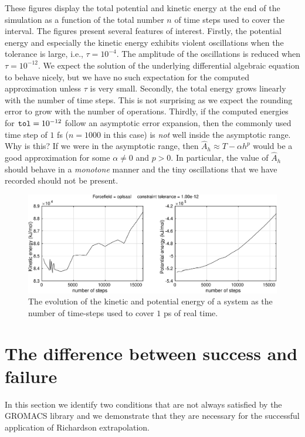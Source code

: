 \documentclass[runningheads]{llncs}
\begin{document}
These figures display the total potential and kinetic energy at the end of the simulation as a function of the total number $n$ of time steps used to cover the interval. The figures present several features of interest.
Firstly, the potential energy and especially the kinetic energy exhibits violent oscillations when the tolerance is large, i.e., $\tau = 10^{-4}$. The amplitude of the oscillations is reduced when $\tau = 10^{-12}$. We expect the solution of the underlying differential algebraic equation to behave nicely, but we have no such expectation for the computed approximation unless $\tau$ is very small. 
Secondly, the total energy grows linearly with the number of time steps. This is not surprising as we expect the rounding error to grow with the number of operations.
Thirdly, if the computed energies for ${\tt tol} = 10 ^{-12}$ follow an asymptotic error expansion, then the commonly used time step of $1$ fs ($n=1000$ in this case) is \emph{not} well inside the asymptotic range. Why is this? If we were in the asymptotic range, then $\hat{A}_h \approx T - \alpha h^p$ would be a good approximation for some $\alpha \not = 0$ and $p>0$. In particular, the value of $\hat{A}_h$ should behave in a \emph{monotone} manner and the tiny oscillations that we have recorded should not be present.




\begin{figure}
  \centering
  \includegraphics[width=\linewidth]{oplsaaltol12.pdf}
   \caption{The evolution of the kinetic and potential energy of a system as the number of time-steps used to cover $1$ ps of real time.} \label{fig:oplsaaltol12}
\end{figure}


\section{The difference between success and failure}

In this section we identify two conditions that are not always satisfied by the GROMACS library and we demonstrate that they are necessary for the successful application of Richardson extrapolation.
\end{document}

